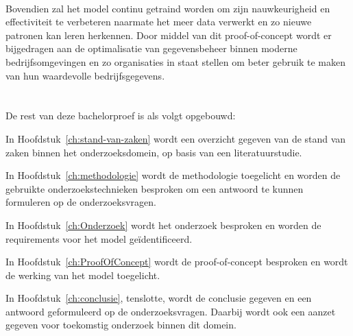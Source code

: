 \\
Bovendien zal het model continu getraind worden om zijn nauwkeurigheid en effectiviteit te verbeteren naarmate het meer data verwerkt en zo nieuwe patronen kan leren herkennen. Door middel van dit proof-of-concept wordt er bijgedragen aan de optimalisatie van gegevensbeheer binnen moderne bedrijfsomgevingen en zo organisaties in staat stellen om beter gebruik te maken van hun waardevolle bedrijfsgegevens.

\section{}%
\label{sec:opzet-bachelorproef}


De rest van deze bachelorproef is als volgt opgebouwd:

In Hoofdstuk~\ref{ch:stand-van-zaken} wordt een overzicht gegeven van de stand van zaken binnen het onderzoeksdomein, op basis van een literatuurstudie.

In Hoofdstuk~\ref{ch:methodologie} wordt de methodologie toegelicht en worden de gebruikte onderzoekstechnieken besproken om een antwoord te kunnen formuleren op de onderzoeksvragen.

In Hoofdstuk~\ref{ch:Onderzoek} wordt het onderzoek besproken en worden de requirements voor het model geïdentificeerd.

In Hoofdstuk~\ref{ch:ProofOfConcept} wordt de proof-of-concept besproken en wordt de werking van het model toegelicht.


In Hoofdstuk~\ref{ch:conclusie}, tenslotte, wordt de conclusie gegeven en een antwoord geformuleerd op de onderzoeksvragen. Daarbij wordt ook een aanzet gegeven voor toekomstig onderzoek binnen dit domein.